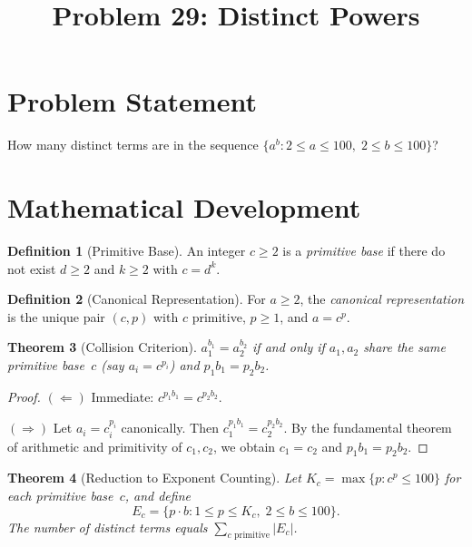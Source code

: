 \documentclass[12pt,a4paper]{article}
\title{Problem 29: Distinct Powers}
\author{}
\date{}
\newtheorem{theorem}{Theorem}
\theoremstyle{definition}
\newtheorem{definition}[theorem]{Definition}
\begin{document}
\maketitle

\section{Problem Statement}

How many distinct terms are in the sequence $\{a^b : 2 \leq a \leq 100, \; 2 \leq b \leq 100\}$?

\section{Mathematical Development}

\begin{definition}[Primitive Base]
An integer $c \geq 2$ is a \emph{primitive base} if there do not exist $d \geq 2$ and $k \geq 2$ with $c = d^k$.
\end{definition}

\begin{definition}[Canonical Representation]
For $a \geq 2$, the \emph{canonical representation} is the unique pair $(c, p)$ with $c$ primitive, $p \geq 1$, and $a = c^p$.
\end{definition}

\begin{theorem}[Collision Criterion]\label{thm:collision}
$a_1^{b_1} = a_2^{b_2}$ if and only if $a_1, a_2$ share the same primitive base~$c$ (say $a_i = c^{p_i}$) and $p_1 b_1 = p_2 b_2$.
\end{theorem}

\begin{proof}
$(\Leftarrow)$ Immediate: $c^{p_1 b_1} = c^{p_2 b_2}$.

$(\Rightarrow)$ Let $a_i = c_i^{p_i}$ canonically. Then $c_1^{p_1 b_1} = c_2^{p_2 b_2}$. By the fundamental theorem of arithmetic and primitivity of $c_1, c_2$, we obtain $c_1 = c_2$ and $p_1 b_1 = p_2 b_2$.
\end{proof}

\begin{theorem}[Reduction to Exponent Counting]\label{thm:reduction}
Let $K_c = \max\{p : c^p \leq 100\}$ for each primitive base~$c$, and define
\[
E_c = \{p \cdot b : 1 \leq p \leq K_c, \; 2 \leq b \leq 100\}.
\]
The number of distinct terms equals $\displaystyle\sum_{c \text{ primitive}} |E_c|$.
\end{theorem}
\end{document}
